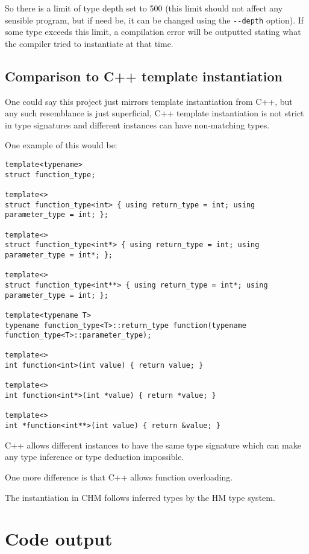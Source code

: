 So there is a limit of type depth set to 500 (this limit should not affect any sensible program, but if need be, it can be changed using the \lstinline[language=sh]{--depth} option). If some type exceeds this limit, a compilation error will be outputted stating what the compiler tried to instantiate at that time.

\subsection{Comparison to C++ template instantiation}

One could say this project just mirrors template instantiation from C++, but any such resemblance is just superficial, C++ template instantiation is not strict in type signatures and different instances can have
non-matching types.

One example of this would be:


\begin{lstlisting}
template<typename>
struct function_type;

template<>
struct function_type<int> { using return_type = int; using parameter_type = int; };

template<>
struct function_type<int*> { using return_type = int; using parameter_type = int*; };

template<>
struct function_type<int**> { using return_type = int*; using parameter_type = int; };

template<typename T>
typename function_type<T>::return_type function(typename function_type<T>::parameter_type);

template<>
int function<int>(int value) { return value; }

template<>
int function<int*>(int *value) { return *value; }

template<>
int *function<int**>(int value) { return &value; }
\end{lstlisting}

C++ allows different instances to have the same type signature which can make any type inference or type deduction impossible.

One more difference is that C++ allows function overloading. %

The instantiation in CHM follows inferred types by the HM type system.

\section{Code output}

